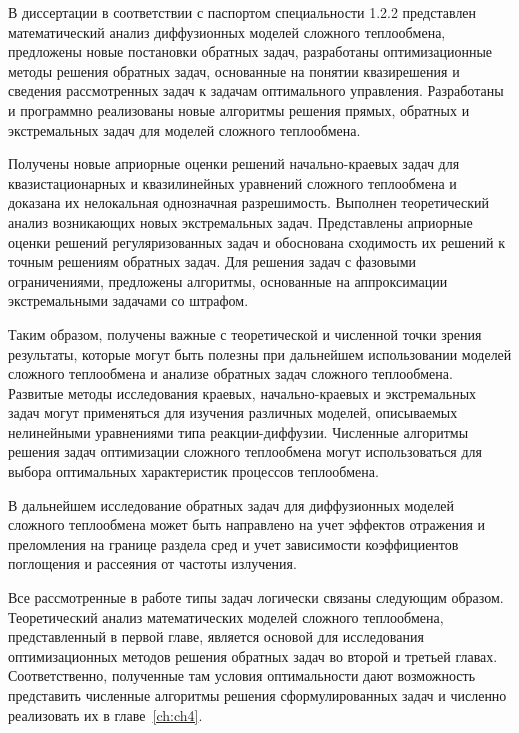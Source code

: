 В диссертации в соответствии с паспортом специальности 1.2.2 представлен
математический анализ диффузионных моделей сложного теплообмена,
предложены новые постановки обратных задач, разработаны
оптимизационные методы решения обратных задач, основанные на понятии
квазирешения и сведения рассмотренных задач к задачам оптимального
управления.
Разработаны и программно реализованы новые алгоритмы
решения прямых, обратных и экстремальных задач для моделей сложного
теплообмена.


Получены новые априорные оценки решений начально-краевых задач для
квазистационарных и квазилинейных уравнений сложного теплообмена и
доказана их нелокальная однозначная разрешимость.
Выполнен теоретический анализ возникающих новых экстремальных задач.
Представлены априорные оценки решений регуляризованных задач и
обоснована сходимость их решений к точным решениям обратных задач.
Для решения задач с фазовыми ограничениями, предложены алгоритмы,
основанные на аппроксимации экстремальными задачами со штрафом.


Таким образом, получены важные с теоретической и численной точки зрения
результаты, которые могут быть полезны при дальнейшем использовании
моделей сложного теплообмена и анализе обратных задач сложного
теплообмена.
Развитые методы исследования краевых, начально-краевых и
экстремальных задач могут применяться для изучения различных моделей,
описываемых нелинейными уравнениями типа реакции-диффузии.
Численные алгоритмы решения задач оптимизации сложного теплообмена
могут использоваться для выбора оптимальных характеристик процессов
теплообмена.

В дальнейшем исследование обратных задач для диффузионных моделей
сложного теплообмена может быть направлено на учет эффектов отражения
и преломления на границе раздела сред и учет зависимости коэффициентов
поглощения и рассеяния от частоты излучения.

Все рассмотренные в работе типы задач логически связаны следующим образом.
Теоретический анализ математических моделей сложного
теплообмена, представленный в первой главе, является основой для
исследования оптимизационных методов решения обратных задач во второй
и третьей главах.
Соответственно, полученные там условия оптимальности
дают возможность представить численные алгоритмы решения
сформулированных задач и численно реализовать их в главе~\ref{ch:ch4}.


